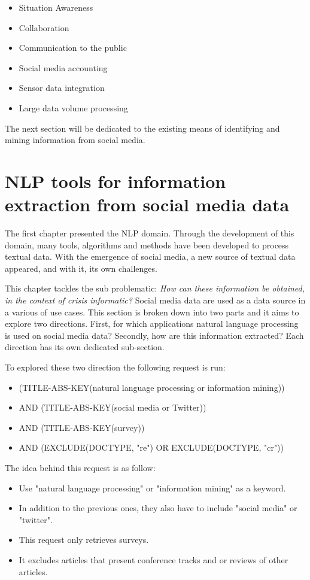 \begin{itemize}
    \item Situation Awareness
    \item Collaboration
    \item Communication to the public
    \item Social media accounting
    \item Sensor data integration
    \item Large data volume processing
\end{itemize}

The next section will be dedicated to the existing means of identifying and mining information from social media.

\section{NLP tools for information extraction from social media data}
The first chapter presented the NLP domain.
Through the development of this domain, many tools, algorithms and methods have been developed to process textual data.
With the emergence of social media, a new source of textual data appeared, and with it, its own challenges.

This chapter tackles the sub problematic: \emph{How can these information be obtained, in the context of crisis informatic?}
Social media data are used as a data source in a various of use cases.
This section is broken down into two parts and it aims to explore two directions.
First, for which applications natural language processing is used on social media data?
Secondly, how are this information extracted?
Each direction has its own dedicated sub-section.

To explored these two direction the following request is run:

\begin{itemize}
    \item (TITLE-ABS-KEY({natural language processing} or {information mining}))
    \item AND (TITLE-ABS-KEY({social media} or Twitter))
    \item AND (TITLE-ABS-KEY(survey))
    \item AND (EXCLUDE(DOCTYPE, "re") OR EXCLUDE(DOCTYPE, "cr"))
\end{itemize}

The idea behind this request is as follow:

\begin{itemize}
    \item Use "natural language processing" or "information mining" as a keyword.
    \item In addition to the previous ones, they also have to include "social media" or "twitter".
    \item This request only retrieves surveys.
    \item It excludes articles that present conference tracks and or reviews of other articles.
\end{itemize}

